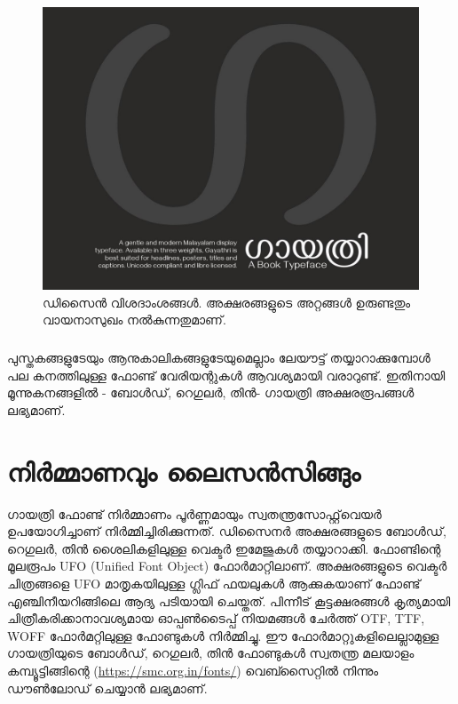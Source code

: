 \documentclass[a4paper, 12pt]{report}
\begin{document}
	\begin{figure}
		\begin{centering}
			\includegraphics[width=1.0\textwidth]{ga.jpg}
			\caption{ഡിസൈന്‍ വിശദാംശങ്ങള്‍. അക്ഷരങ്ങളുടെ അറ്റങ്ങൾ ഉരുണ്ടതും വായനാസുഖം നൽകുന്നതുമാണ്.}
			\label{one}
		\end{centering}
	\end{figure}
	
	\paragraph{}
	പുസ്തകങ്ങളുടേയും ആനുകാലികങ്ങളുടേയുമെല്ലാം ലേയൗട്ട് തയ്യാറാക്കുമ്പോള്‍ പല കനത്തിലുള്ള ഫോണ്ട് വേരിയന്റുകള്‍ ആവശ്യമായി വരാറുണ്ട്. ഇതിനായി മൂന്നുകനങ്ങളില്‍ - ബോള്‍ഡ്, റെഗുലര്‍, തിന്‍- ഗായത്രി അക്ഷരരൂപങ്ങള്‍ ലഭ്യമാണ്. 
	
	\chapter*{നിര്‍മ്മാണവും ലൈസന്‍സിങ്ങും}
	
	ഗായത്രി ഫോണ്ട് നിര്‍മ്മാണം പൂര്‍ണ്ണമായും സ്വതന്ത്രസോഫ്റ്റ്‌വെയർ ഉപയോഗിച്ചാണ് നിർമ്മിച്ചിരിക്കുന്നത്. ഡിസൈനര്‍ അക്ഷരങ്ങളുടെ ബോള്‍ഡ്, റെഗുലര്‍, തിന്‍ ശൈലികളിലുള്ള വെക്ടര്‍ ഇമേജുകള്‍ തയ്യാറാക്കി. ഫോണ്ടിന്റെ മൂലരൂപം UFO (Unified Font Object) ഫോര്‍മാറ്റിലാണ്. അക്ഷരങ്ങളുടെ വെക്ടർ ചിത്രങ്ങളെ UFO മാതൃകയിലുള്ള ഗ്ലിഫ് ഫയലുകള്‍ ആക്കുകയാണ് ഫോണ്ട് എഞ്ചിനീയറിങ്ങിലെ ആദ്യ പടിയായി ചെയ്തത്. പിന്നീട് കൂട്ടക്ഷരങ്ങള്‍ കൃത്യമായി ചിത്രീകരിക്കാനാവശ്യമായ ഓപ്പണ്‍ടൈപ്പ് നിയമങ്ങള്‍ ചേര്‍ത്ത്  OTF, TTF, WOFF ഫോര്‍മറ്റിലുള്ള ഫോണ്ടുകള്‍ നിര്‍മ്മിച്ചു. ഈ ഫോര്‍മാറ്റുകളിലെല്ലാമുള്ള ഗായത്രിയുടെ ബോള്‍ഡ്, റെഗുലര്‍, തിന്‍ ഫോണ്ടുകള്‍ സ്വതന്ത്ര മലയാളം കമ്പ്യൂട്ടിങ്ങിന്റെ (\url{https://smc.org.in/fonts/}) വെബ്സൈറ്റിൽ നിന്നും ഡൗണ്‍ലോഡ് ചെയ്യാന്‍ ലഭ്യമാണ്.
	
\end{document}
